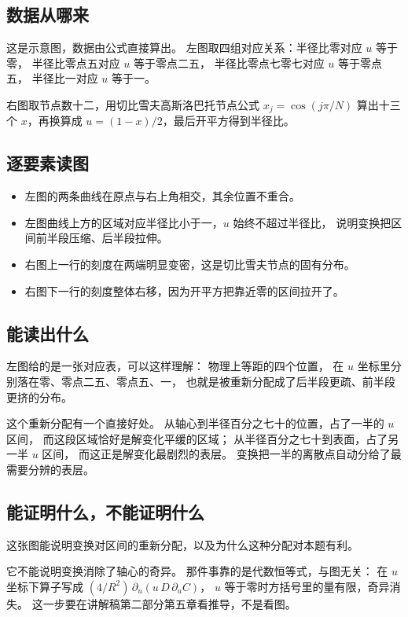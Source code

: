 \documentclass[11pt,a4paper]{article}
\begin{document}
\subsection{数据从哪来}

这是示意图，数据由公式直接算出。
左图取四组对应关系：半径比零对应 $u$ 等于零，
半径比零点五对应 $u$ 等于零点二五，
半径比零点七零七对应 $u$ 等于零点五，
半径比一对应 $u$ 等于一。

右图取节点数十二，用切比雪夫高斯洛巴托节点公式 $x_j=\cos(j\pi/N)$
算出十三个 $x$，再换算成 $u=(1-x)/2$，最后开平方得到半径比。

\subsection{逐要素读图}

\begin{itemize}[leftmargin=1.6em]
\item 左图的两条曲线在原点与右上角相交，其余位置不重合。
\item 左图曲线上方的区域对应半径比小于一，$u$ 始终不超过半径比，
      说明变换把区间前半段压缩、后半段拉伸。
\item 右图上一行的刻度在两端明显变密，这是切比雪夫节点的固有分布。
\item 右图下一行的刻度整体右移，因为开平方把靠近零的区间拉开了。
\end{itemize}

\subsection{能读出什么}

左图给的是一张对应表，可以这样理解：
物理上等距的四个位置，
在 $u$ 坐标里分别落在零、零点二五、零点五、一，
也就是被重新分配成了后半段更疏、前半段更挤的分布。

这个重新分配有一个直接好处。
从轴心到半径百分之七十的位置，占了一半的 $u$ 区间，
而这段区域恰好是解变化平缓的区域；
从半径百分之七十到表面，占了另一半 $u$ 区间，
而这正是解变化最剧烈的表层。
变换把一半的离散点自动分给了最需要分辨的表层。

\subsection{能证明什么，不能证明什么}

这张图能说明变换对区间的重新分配，以及为什么这种分配对本题有利。

它不能说明变换消除了轴心的奇异。
那件事靠的是代数恒等式，与图无关：
在 $u$ 坐标下算子写成 $(4/R^2)\,\partial_u(u\,D\,\partial_u C)$，
$u$ 等于零时方括号里的量有限，奇异消失。
这一步要在讲解稿第二部分第五章看推导，不是看图。
\end{document}
